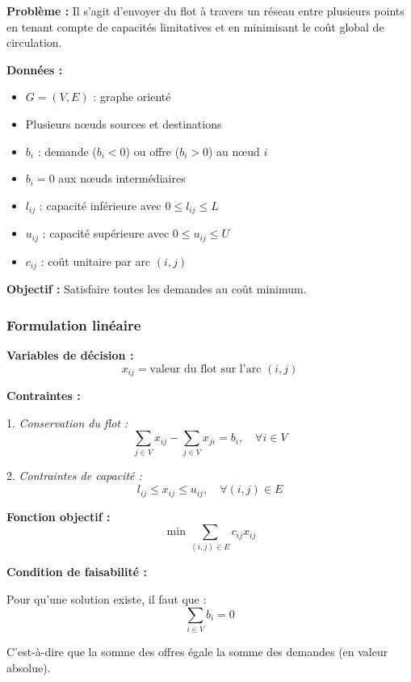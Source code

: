 \documentclass[12pt,a4paper]{article}
\begin{document}
\begin{definition}
\textbf{Problème :} Il s'agit d'envoyer du flot à travers un réseau entre plusieurs points en tenant compte de capacités limitatives et en minimisant le coût global de circulation.

\textbf{Données :}
\begin{itemize}
    \item $G = (V, E)$ : graphe orienté
    \item Plusieurs nœuds sources et destinations
    \item $b_i$ : demande ($b_i < 0$) ou offre ($b_i > 0$) au nœud $i$
    \item $b_i = 0$ aux nœuds intermédiaires
    \item $l_{ij}$ : capacité inférieure avec $0 \leq l_{ij} \leq L$
    \item $u_{ij}$ : capacité supérieure avec $0 \leq u_{ij} \leq U$
    \item $c_{ij}$ : coût unitaire par arc $(i,j)$
\end{itemize}

\textbf{Objectif :} Satisfaire toutes les demandes au coût minimum.
\end{definition}

\subsubsection{Formulation linéaire}

\begin{definition}
\textbf{Variables de décision :}
$$x_{ij} = \text{valeur du flot sur l'arc } (i,j)$$

\textbf{Contraintes :}

1. \textit{Conservation du flot :}
$$\sum_{j \in V} x_{ij} - \sum_{j \in V} x_{ji} = b_i, \quad \forall i \in V$$

2. \textit{Contraintes de capacité :}
$$l_{ij} \leq x_{ij} \leq u_{ij}, \quad \forall (i,j) \in E$$

\textbf{Fonction objectif :}
$$\min \sum_{(i,j) \in E} c_{ij} x_{ij}$$
\end{definition}

\begin{notecours}
\textbf{Condition de faisabilité :}

Pour qu'une solution existe, il faut que :
$$\sum_{i \in V} b_i = 0$$

C'est-à-dire que la somme des offres égale la somme des demandes (en valeur absolue).
\end{notecours}
\end{document}
